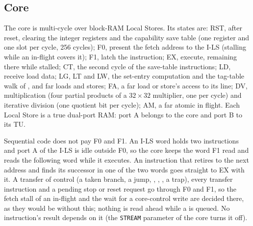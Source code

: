 \subsection{Core}
The core is multi-cycle over block-RAM Local Stores. Its states are: RST, after reset, clearing the
integer registers and the capability save table (one register and one slot per cycle, 256 cycles);
F0, present the fetch address to the I-LS (stalling while an in-flight  covers it); F1,
latch the instruction; EX, execute, remaining there while stalled; CT, the second cycle of the
save-table instructions; LD, receive load data; LG, LT and LW, the set-entry computation and the
tag-table walk of ,  and far loads and stores; FA, a far load or store's
access to its line; DV, multiplication (four partial products of a
$32\times32$ multiplier, one per cycle) and iterative division (one quotient bit per cycle); AM, a far
atomic in flight. Each Local Store is a true dual-port RAM: port A belongs to the core and port B to
its TU.

Sequential code does not pay F0 and F1. An I-LS word holds two instructions and port A of the I-LS
is idle outside F0, so the core keeps the word F1 read and reads the following word while it
executes. An instruction that retires to the next address and finds its successor in one of the two
words goes straight to EX with it. A transfer of control (a taken branch, a jump, ,
, , a trap), every transfer instruction and a pending stop or reset request
go through F0 and F1, so the fetch stall of an in-flight  and the wait for a
core-control write are decided there, as they would be without this; nothing is read ahead while a
 is queued. No instruction's result depends on it (the \texttt{STREAM} parameter of
the core turns it off).

